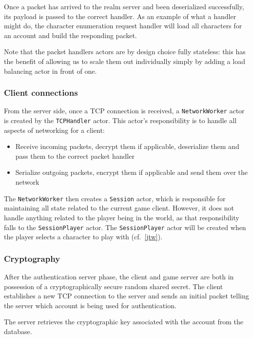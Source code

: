 \documentclass[paper=a4, fontsize=11pt]{scrartcl}
\begin{document}
Once a packet has arrived to the realm server and been deserialized
successfully, its payload is passed to the correct handler.
As an example of what a handler might do, the character enumeration request
handler will load all characters for an account and build the responding packet.

Note that the packet handlers actors are by design choice fully stateless: this
has the benefit of allowing us to scale them out individually simply by adding a
load balancing actor in front of one.

\subsubsection{Client connections}

From the server side, once a TCP connection is received, a
\texttt{NetworkWorker} actor is created by the \texttt{TCPHandler} actor.
This actor's responsibility is to handle all aspects of networking for a client:
\begin{itemize}
    \item Receive incoming packets, decrypt them if applicable, deserialize them
        and pass them to the correct packet handler
    \item Serialize outgoing packets, encrypt them if applicable and send them
        over the network
\end{itemize}

The \texttt{NetworkWorker} then creates a \texttt{Session} actor, which is
responsible for maintaining all state related to the current game client.
However, it does not handle anything related to the player being in the world,
as that responsibility falls to the \texttt{SessionPlayer} actor.
The \texttt{SessionPlayer} actor will be created when the player selects a
character to play with (cf.~\ref{jtw}).

\subsubsection{Cryptography}

After the authentication server phase, the client and game server are both in
possession of a cryptographically secure random shared secret.
The client establishes a new TCP connection to the server and sends an initial
packet telling the server which account is being used for authentication.

The server retrieves the cryptographic key associated with the account from the
database.
\end{document}
